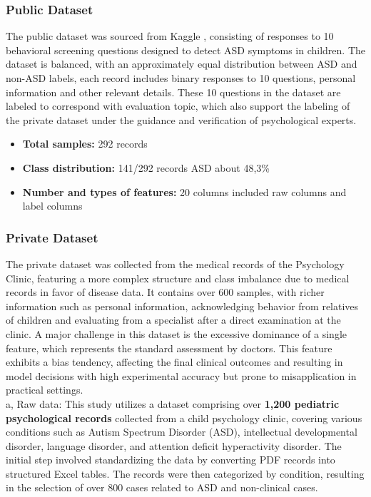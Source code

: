 \documentclass[conference]{IEEEtran}
\begin{document}
\subsubsection{Public Dataset}
The public dataset was sourced from Kaggle \cite{b18}, consisting of responses to 10 behavioral screening questions designed to detect ASD symptoms in children. The dataset is balanced, with an approximately equal distribution between ASD and non-ASD labels, each record includes binary responses to 10 questions, personal information and other relevant details. These 10 questions in the dataset are labeled to correspond with evaluation topic, which also support the labeling of the private dataset under the guidance and verification of psychological experts.
\begin{itemize}
    \item \textbf{Total samples:} 292 records
    \item \textbf{Class distribution:} 141/292 records ASD about 48,3\% 
    \item \textbf{Number and types of features:} 20 columns included raw columns and label columns
\end{itemize}

\subsubsection{Private Dataset}
The private dataset was collected from the medical records of the Psychology Clinic, featuring a more complex structure and class imbalance due to medical records in favor of disease data. It contains over 600 samples, with richer information such as personal information, acknowledging behavior from relatives of children and evaluating from a specialist after a direct examination at the clinic. A major challenge in this dataset is the excessive dominance of a single feature, which represents the standard assessment by doctors. This feature exhibits a bias tendency, affecting the final clinical outcomes and resulting in model decisions with high experimental accuracy but prone to misapplication in practical settings.\\

a, Raw data: This study utilizes a dataset comprising over \textbf{1,200 pediatric psychological records} collected from a child psychology clinic, covering various conditions such as Autism Spectrum Disorder (ASD), intellectual developmental disorder, language disorder, and attention deficit hyperactivity disorder. The initial step involved standardizing the data by converting PDF records into structured Excel tables. The records were then categorized by condition, resulting in the selection of over 800 cases related to ASD and non-clinical cases.\\
\end{document}
